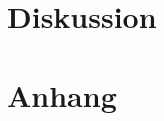 \section{Diskussion}
\label{sec:Diskussion}


\printbibliography{}

\section*{Anhang}
\label{sec:anhang}
